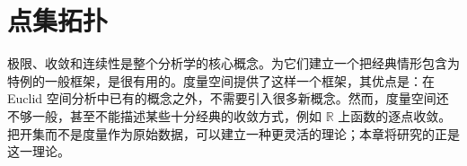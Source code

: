 \documentclass[../main.tex]{subfiles} %
\begin{document}
\chapter{点集拓扑}\label{chapter:ch04-topology}
极限、收敛和连续性是整个分析学的核心概念。为它们建立一个把经典情形包含为特例的一般框架，是很有用的。度量空间提供了这样一个框架，其优点是：在 Euclid 空间分析中已有的概念之外，不需要引入很多新概念。然而，度量空间还不够一般，甚至不能描述某些十分经典的收敛方式，例如 $\mathbb R$ 上函数的逐点收敛。把开集而不是度量作为原始数据，可以建立一种更灵活的理论；本章将研究的正是这一理论。









\end{document}
